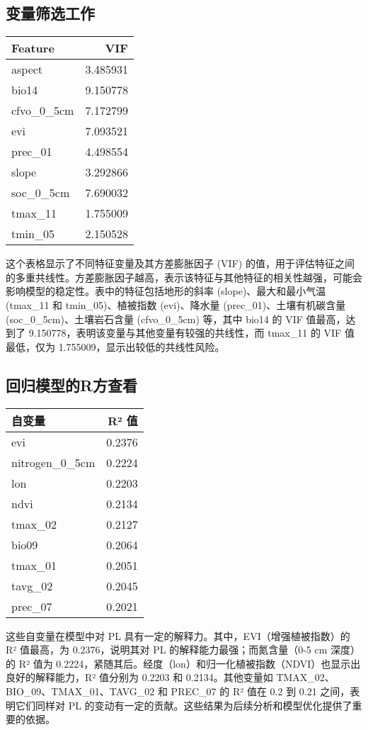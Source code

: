 \documentclass{article}
\begin{document}
	\subsection{变量筛选工作}
	\begin{tabular}{lr}
		\toprule
		Feature & VIF \\
		\midrule
		aspect & 3.485931 \\
		bio14 & 9.150778 \\
		cfvo\_0\_5cm & 7.172799 \\
		evi & 7.093521 \\
		prec\_01 & 4.498554 \\
		slope & 3.292866 \\
		soc\_0\_5cm & 7.690032 \\
		tmax\_11 & 1.755009 \\
		tmin\_05 & 2.150528 \\
		\bottomrule
	\end{tabular}
	
	这个表格显示了不同特征变量及其方差膨胀因子 (VIF) 的值，用于评估特征之间的多重共线性。方差膨胀因子越高，表示该特征与其他特征的相关性越强，可能会影响模型的稳定性。表中的特征包括地形的斜率 (slope)、最大和最小气温 (tmax\_11 和 tmin\_05)、植被指数 (evi)、降水量 (prec\_01)、土壤有机碳含量 (soc\_0\_5cm)、土壤岩石含量 (cfvo\_0\_5cm) 等，其中 bio14 的 VIF 值最高，达到了 9.150778，表明该变量与其他变量有较强的共线性，而 tmax\_11 的 VIF 值最低，仅为 1.755009，显示出较低的共线性风险。
	
	
	\subsection{回归模型的R方查看}
\begin{table}

	\begin{tabular}{lr}
		\toprule
		\textbf{自变量} & \textbf{R² 值} \\ \midrule
		evi & 0.2376 \\ 
		nitrogen\_0\_5cm & 0.2224 \\ 
		lon & 0.2203 \\ 
		ndvi & 0.2134 \\ 
		tmax\_02 & 0.2127 \\ 
		bio09 & 0.2064 \\ 
		tmax\_01 & 0.2051 \\ 
		tavg\_02 & 0.2045 \\ 
		prec\_07 & 0.2021 \\ 
		\bottomrule
	\end{tabular}

	

\end{table}
这些自变量在模型中对 PL 具有一定的解释力。其中，EVI（增强植被指数）的 R² 值最高，为 0.2376，说明其对 PL 的解释能力最强；而氮含量（0-5 cm 深度）的 R² 值为 0.2224，紧随其后。经度（lon）和归一化植被指数（NDVI）也显示出良好的解释能力，R² 值分别为 0.2203 和 0.2134。其他变量如 TMAX\_02、BIO\_09、TMAX\_01、TAVG\_02 和 PREC\_07 的 R² 值在 0.2 到 0.21 之间，表明它们同样对 PL 的变动有一定的贡献。这些结果为后续分析和模型优化提供了重要的依据。
\end{document}

